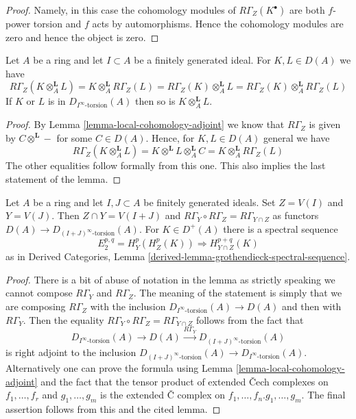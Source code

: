 \begin{proof}
Namely, in this case the cohomology modules of $R\Gamma_Z(K^\bullet)$
are both $f$-power torsion and $f$ acts by automorphisms. Hence the
cohomology modules are zero and hence the object is zero.
\end{proof}

\begin{lemma}
\label{lemma-torsion-tensor-product}
Let $A$ be a ring and let $I \subset A$ be a finitely generated ideal.
For $K, L \in D(A)$ we have
$$
R\Gamma_Z(K \otimes_A^\mathbf{L} L) =
K \otimes_A^\mathbf{L} R\Gamma_Z(L) =
R\Gamma_Z(K) \otimes_A^\mathbf{L} L =
R\Gamma_Z(K) \otimes_A^\mathbf{L} R\Gamma_Z(L)
$$
If $K$ or $L$ is in $D_{I^\infty\text{-torsion}}(A)$ then so is
$K \otimes_A^\mathbf{L} L$.
\end{lemma}

\begin{proof}
By Lemma \ref{lemma-local-cohomology-adjoint} we know that
$R\Gamma_Z$ is given by $C \otimes^\mathbf{L} -$ for some $C \in D(A)$.
Hence, for $K, L \in D(A)$ general we have
$$
R\Gamma_Z(K \otimes_A^\mathbf{L} L) =
K \otimes^\mathbf{L} L \otimes_A^\mathbf{L} C =
K \otimes_A^\mathbf{L} R\Gamma_Z(L)
$$
The other equalities follow formally from this one. This also implies
the last statement of the lemma.
\end{proof}

\begin{lemma}
\label{lemma-local-cohomology-ss}
Let $A$ be a ring and let $I, J \subset A$ be finitely generated
ideals. Set $Z = V(I)$ and $Y = V(J)$. Then $Z \cap Y = V(I + J)$
and $R\Gamma_Y \circ R\Gamma_Z = R\Gamma_{Y \cap Z}$ as functors
$D(A) \to D_{(I + J)^\infty\text{-torsion}}(A)$. For $K \in D^+(A)$
there is a spectral sequence
$$
E_2^{p, q} = H^p_Y(H^p_Z(K)) \Rightarrow H^{p + q}_{Y \cap Z}(K)
$$
as in Derived Categories, Lemma
\ref{derived-lemma-grothendieck-spectral-sequence}.
\end{lemma}

\begin{proof}
There is a bit of abuse of notation in the lemma as strictly
speaking we cannot compose $R\Gamma_Y$ and $R\Gamma_Z$. The
meaning of the statement is simply that we are composing
$R\Gamma_Z$ with the inclusion $D_{I^\infty\text{-torsion}}(A) \to D(A)$
and then with $R\Gamma_Y$. Then the equality
$R\Gamma_Y \circ R\Gamma_Z = R\Gamma_{Y \cap Z}$
follows from the fact that
$$
D_{I^\infty\text{-torsion}}(A) \to D(A) \xrightarrow{R\Gamma_Y}
D_{(I + J)^\infty\text{-torsion}}(A)
$$
is right adjoint to the inclusion
$D_{(I + J)^\infty\text{-torsion}}(A) \to D_{I^\infty\text{-torsion}}(A)$.
Alternatively one can prove the formula using
Lemma \ref{lemma-local-cohomology-adjoint}
and the fact that the tensor product of
extended {\v C}ech complexes on $f_1, \ldots, f_r$ and
$g_1, \ldots, g_m$ is the extended {\v C} complex on
$f_1, \ldots, f_n. g_1, \ldots, g_m$.
The final assertion follows from this and the cited lemma.
\end{proof}

